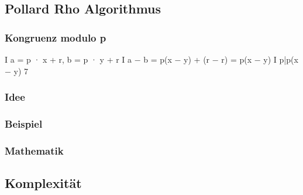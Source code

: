 	
 	\subsection{Pollard Rho Algorithmus}
 	\subsubsection{Kongruenz modulo p}
 	I a = p · x + r, b = p · y + r
 	I a − b = p(x − y) + (r − r) = p(x − y)
 	I p|p(x − y)
 	7
 	\subsubsection{Idee}
 	\subsubsection{Beispiel}
 	\subsubsection{Mathematik}
 	\label{sec:pollardBeweis}
 	\subsection{Komplexit\"at}	